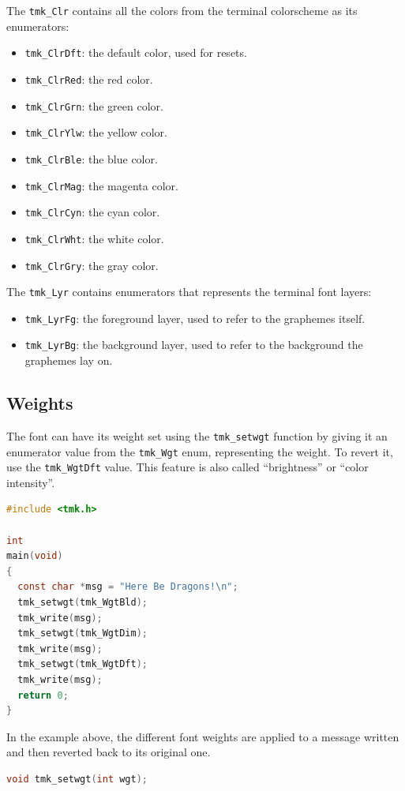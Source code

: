 \documentclass{report}
\begin{document}
The \texttt{tmk\_Clr} contains all the colors from the terminal colorscheme as its enumerators:
\begin{itemize}
  \item \texttt{tmk\_ClrDft}: the default color, used for resets.
  \item \texttt{tmk\_ClrRed}: the red color.
  \item \texttt{tmk\_ClrGrn}: the green color.
  \item \texttt{tmk\_ClrYlw}: the yellow color.
  \item \texttt{tmk\_ClrBle}: the blue color.
  \item \texttt{tmk\_ClrMag}: the magenta color.
  \item \texttt{tmk\_ClrCyn}: the cyan color.
  \item \texttt{tmk\_ClrWht}: the white color.
  \item \texttt{tmk\_ClrGry}: the gray color.
\end{itemize}

The \texttt{tmk\_Lyr} contains enumerators that represents the terminal font layers:
\begin{itemize}
  \item \texttt{tmk\_LyrFg}: the foreground layer, used to refer to the graphemes itself.
  \item \texttt{tmk\_LyrBg}: the background layer, used to refer to the background the graphemes lay on.
\end{itemize}
\subsection{Weights}
The font can have its weight set using the \texttt{tmk\_setwgt} function by giving it an enumerator value from the \texttt{tmk\_Wgt} enum, representing the weight. To revert it, use the \texttt{tmk\_WgtDft} value. This feature is also called ``brightness'' or ``color intensity''.
\begin{lstlisting}[language=c,caption=an example that sets font weights.]
#include <tmk.h>

int
main(void)
{
  const char *msg = "Here Be Dragons!\n";
  tmk_setwgt(tmk_WgtBld);
  tmk_write(msg);
  tmk_setwgt(tmk_WgtDim);
  tmk_write(msg);
  tmk_setwgt(tmk_WgtDft);
  tmk_write(msg);
  return 0;
}
\end{lstlisting}

In the example above, the different font weights are applied to a message written and then reverted back to its original one.
\begin{lstlisting}[language=c,caption=the declaration of the \texttt{tmk\_setwgt} function.]
void tmk_setwgt(int wgt);
\end{lstlisting}
\end{document}
